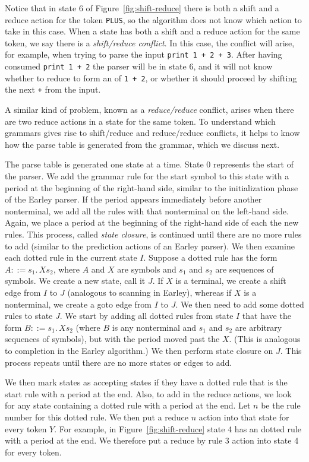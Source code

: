 \documentclass[7x10]{TimesAPriori_MIT}%
\numberwithin{theorem}{chapter}
\numberwithin{definition}{chapter}
\numberwithin{equation}{chapter}
\begin{document}
{Notice that in state 6 of Figure~\ref{fig:shift-reduce} there is both
a shift and a reduce action for the token \lstinline{PLUS}, so the
algorithm does not know which action to take in this case. When a
state has both a shift and a reduce action for the same token, we say
there is a \emph{shift/reduce conflict}.  In this case, the conflict
will arise, for example, when trying to parse the input
\lstinline{print 1 + 2 + 3}. After having consumed \lstinline{print 1 + 2}
the parser will be in state 6, and it will not know whether to
reduce to form an  of \lstinline{1 + 2}, or whether it
should proceed by shifting the next \lstinline{+} from the input.

A similar kind of problem, known as a \emph{reduce/reduce} conflict,
arises when there are two reduce actions in a state for the same
token. To understand which grammars gives rise to shift/reduce and
reduce/reduce conflicts, it helps to know how the parse table is
generated from the grammar, which we discuss next.

The parse table is generated one state at a time. State 0 represents
the start of the parser. We add the grammar rule for the start symbol
to this state with a period at the beginning of the right-hand side,
similar to the initialization phase of the Earley parser.  If the
period appears immediately before another nonterminal, we add all the
rules with that nonterminal on the left-hand side. Again, we place a
period at the beginning of the right-hand side of each the new
rules. This process, called \emph{state closure}, is continued
until there are no more rules to add (similar to the prediction
actions of an Earley parser). We then examine each dotted rule in the
current state $I$. Suppose a dotted rule has the form $A ::=
s_1.\,X s_2$, where $A$ and $X$ are symbols and $s_1$ and $s_2$
are sequences of symbols. We create a new state, call it $J$.  If $X$
is a terminal, we create a shift edge from $I$ to $J$ (analogous to
scanning in Earley), whereas if $X$ is a nonterminal, we create a
goto edge from $I$ to $J$.  We then need to add some dotted rules to
state $J$. We start by adding all dotted rules from state $I$ that
have the form $B ::= s_1.\,Xs_2$ (where $B$ is any nonterminal and
$s_1$ and $s_2$ are arbitrary sequences of symbols), but with
the period moved past the $X$.  (This is analogous to completion in
the Earley algorithm.)  We then perform state closure on $J$.  This
process repeats until there are no more states or edges to add.

We then mark states as accepting states if they have a dotted rule
that is the start rule with a period at the end.  Also, to add
in the reduce actions, we look for any state containing a dotted rule
with a period at the end. Let $n$ be the rule number for this dotted
rule. We then put a reduce $n$ action into that state for every token
$Y$. For example, in Figure~\ref{fig:shift-reduce} state 4 has an
dotted rule with a period at the end. We therefore put a reduce by
rule 3 action into state 4 for every
token.

}
\end{document}
